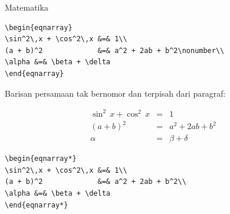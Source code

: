 \documentclass[11pt,            %
               aspectratio=169, %
               xcolor=svgnames,
               t                %
               ]{beamer}
\begin{document}
\begin{frame}{Matematika}
\begin{block}{}
\begin{verbatim}
\begin{eqnarray}
\sin^2\,x + \cos^2\,x &=& 1\\
(a + b)^2             &=& a^2 + 2ab + b^2\nonumber\\
\alpha &=& \beta + \delta
\end{eqnarray}
\end{verbatim}
\end{block}

\newpage

Barisan persamaan tak bernomor dan terpisah dari paragraf:

\begin{eqnarray*}
\sin^2\,x + \cos^2\,x &=& 1\\
(a + b)^2             &=& a^2 + 2ab + b^2\\
\alpha &=& \beta + \delta
\end{eqnarray*}

\begin{block}{}
\begin{verbatim}
\begin{eqnarray*}
\sin^2\,x + \cos^2\,x &=& 1\\
(a + b)^2             &=& a^2 + 2ab + b^2\\
\alpha &=& \beta + \delta
\end{eqnarray*}
\end{verbatim}
\end{block}

\end{frame}

\end{document}
